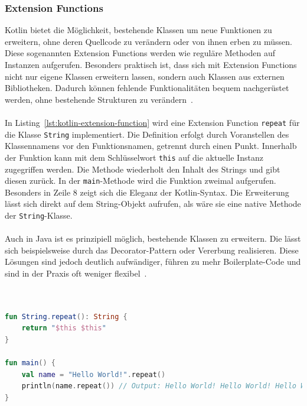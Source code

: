 \documentclass[11pt]{article}
\begin{document}
    \subsubsection{Extension Functions}
    Kotlin bietet die Möglichkeit, bestehende Klassen um neue Funktionen zu erweitern, ohne deren Quellcode zu verändern oder von ihnen erben zu müssen.
    Diese sogenannten Extension Functions werden wie reguläre Methoden auf Instanzen aufgerufen.
    Besonders praktisch ist, dass sich mit Extension Functions nicht nur eigene Klassen erweitern lassen, sondern auch Klassen aus externen Bibliotheken.
    Dadurch können fehlende Funktionalitäten bequem nachgerüstet werden, ohne bestehende Strukturen zu verändern~\cite{kotlin-extensions}.\\
    \\
    In Listing~\ref{lst:kotlin-extension-function} wird eine Extension Function \texttt{repeat} für die Klasse \texttt{String} implementiert.
    Die Definition erfolgt durch Voranstellen des Klassennamens vor den Funktionsnamen, getrennt durch einen Punkt.
    Innerhalb der Funktion kann mit dem Schlüsselwort \texttt{this} auf die aktuelle Instanz zugegriffen werden.
    Die Methode wiederholt den Inhalt des Strings und gibt diesen zurück.
    In der \texttt{main}-Methode wird die Funktion zweimal aufgerufen.
    Besonders in Zeile 8 zeigt sich die Eleganz der Kotlin-Syntax.
    Die Erweiterung lässt sich direkt auf dem String-Objekt aufrufen, als wäre sie eine native Methode der \texttt{String}-Klasse.\\
    \\
    Auch in Java ist es prinzipiell möglich, bestehende Klassen zu erweitern.
    Die lässt sich beispielsweise durch das Decorator-Pattern oder Vererbung realisieren.
    Diese Lösungen sind jedoch deutlich aufwändiger, führen zu mehr Boilerplate-Code und sind in der Praxis oft weniger flexibel~\cite{kotlin-extensions}.\\
    \\

    \begin{lstlisting}[language=Kotlin, caption={ExtensionFunction.kt}, label={lst:kotlin-extension-function}]

fun String.repeat(): String {
    return "$this $this"
}

fun main() {
    val name = "Hello World!".repeat()
    println(name.repeat()) // Output: Hello World! Hello World! Hello World! Hello World!
}
    \end{lstlisting}
\end{document}
